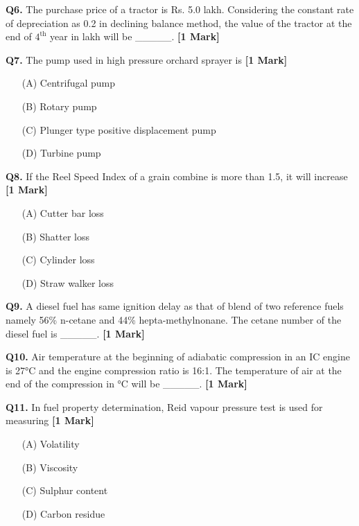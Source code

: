 \documentclass[11pt]{article}
\newcommand{\questiona}[2]{
    \noindent\textbf{Q#2.} #1 \hfill \textbf{[1 Mark]}
}
\begin{document}
\questiona{The purchase price of a tractor is Rs. 5.0 lakh. Considering the constant rate of depreciation as 0.2 in declining balance method, the value of the tractor at the end of $4^\text{th}$ year in lakh will be \_\_\_\_\_.}{6}

\vspace{0.5cm}

\questiona{The pump used in high pressure orchard sprayer is}{7}
\begin{enumerate}
    \item[(A)] Centrifugal pump  
    \item[(B)] Rotary pump  
    \item[(C)] Plunger type positive displacement pump
    \item[(D)] Turbine pump
\end{enumerate}

\vspace{0.5cm}

\questiona{If the Reel Speed Index of a grain combine is more than 1.5, it will increase}{8}
\begin{enumerate}
    \item[(A)] Cutter bar loss
    \item[(B)] Shatter loss  
    \item[(C)] Cylinder loss
    \item[(D)] Straw walker loss
\end{enumerate}

\vspace{0.5cm}

\questiona{A diesel fuel has same ignition delay as that of blend of two reference fuels namely 56\% n-cetane and 44\% hepta-methylnonane. The cetane number of the diesel fuel is \_\_\_\_\_.}{9}

\vspace{0.5cm}

\questiona{Air temperature at the beginning of adiabatic compression in an IC engine is 27°C and the engine compression ratio is 16:1. The temperature of air at the end of the compression in °C will be \_\_\_\_\_.}{10}

\vspace{0.5cm}

\questiona{In fuel property determination, Reid vapour pressure test is used for measuring}{11}
\begin{enumerate}
    \item[(A)] Volatility
    \item[(B)] Viscosity
    \item[(C)] Sulphur content
    \item[(D)] Carbon residue
\end{enumerate}
\end{document}
